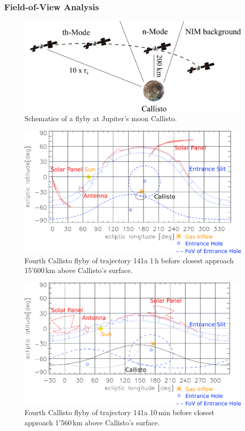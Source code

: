 		\subsubsection{Field-of-View Analysis }\label{subsubsec:Calfly}
		\begin{figure}[h!]
			\centering
			\includegraphics[width=.8\textwidth]{Bilder/Callisto_flyby_schematic.png}
			\caption{Schematics of a flyby at Jupiter's moon Callisto.}
			\label{fig:CalflybySchem}
		\end{figure}
		\begin{figure}[h!]
			\centering
			\includegraphics[width = .7\textwidth]{Bilder/NIM_pointing_2031JAN15185200.png}
			\caption{Fourth Callisto flyby of trajectory 141a \cite{SOC_Crema3p2} 1\,h before closest approach 15'600\,km above Callisto's surface.}
			\label{fig:FlybyCal1852}
		\end{figure}
		\begin{figure}[h!]
			\centering
			\includegraphics[width = .7\textwidth]{Bilder/NIM_pointing_2031JAN15194200.png}
			\caption{Fourth Callisto flyby of trajectory 141a \cite{SOC_Crema3p2} 10\,min before closest approach 1'560\,km above Callisto's surface.}
			\label{fig:FlybyCal1942}
		\end{figure}
